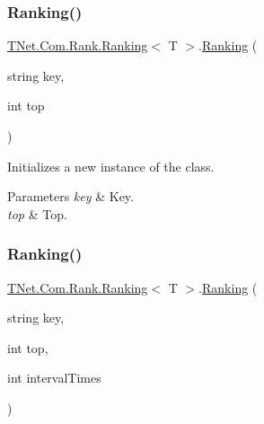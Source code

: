 \subsubsection{\texorpdfstring{Ranking()}{Ranking()}\hspace{0.1cm}{\footnotesize\ttfamily [2/3]}}
{\footnotesize\ttfamily \mbox{\hyperlink{class_t_net_1_1_com_1_1_rank_1_1_ranking}{T\+Net.\+Com.\+Rank.\+Ranking}}$<$ T $>$.\mbox{\hyperlink{class_t_net_1_1_com_1_1_rank_1_1_ranking}{Ranking}} (\begin{DoxyParamCaption}\item[{string}]{key,  }\item[{int}]{top }\end{DoxyParamCaption})\hspace{0.3cm}{\ttfamily [protected]}}



Initializes a new instance of the class. 


\begin{DoxyParams}{Parameters}
{\em key} & Key.\\
\hline
{\em top} & Top.\\
\hline
\end{DoxyParams}
\mbox{\label{class_t_net_1_1_com_1_1_rank_1_1_ranking_a23464bac5898e26b7de225c9be93f32d}} 
\subsubsection{\texorpdfstring{Ranking()}{Ranking()}\hspace{0.1cm}{\footnotesize\ttfamily [3/3]}}
{\footnotesize\ttfamily \mbox{\hyperlink{class_t_net_1_1_com_1_1_rank_1_1_ranking}{T\+Net.\+Com.\+Rank.\+Ranking}}$<$ T $>$.\mbox{\hyperlink{class_t_net_1_1_com_1_1_rank_1_1_ranking}{Ranking}} (\begin{DoxyParamCaption}\item[{string}]{key,  }\item[{int}]{top,  }\item[{int}]{interval\+Times }\end{DoxyParamCaption})\hspace{0.3cm}{\ttfamily [protected]}}






